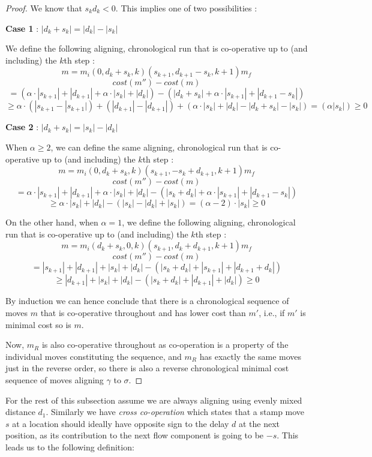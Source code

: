 \documentclass[runningheads]{llncs}
\begin{document}
\begin{proof}
        We know that $s_kd_k < 0$. 
        This implies one of two possibilities : 
        
        \textbf{Case 1} : $|d_k + s_k| = |d_k| - |s_k|$
        
        We define the following aligning, chronological run that is co-operative up to (and including) the $k$th step : 
        $$m = m_i( 0, d_k + s_k, k)( s_{k+1}, d_{k+1} - s_k, k+1)m_f$$
        $$cost(m'') - cost(m)  $$$$ = (\alpha \cdot |s_{k+1}| + |d_{k+1}| + \alpha \cdot |s_k| + |d_k|) - ( | d_k + s_k| + \alpha \cdot | s_{k+1}| + | d_{k+1} - s_k |) $$ 
        $$\geq \alpha \cdot (|s_{k+1} - |s_{k+1}|) + (|d_{k+1}| - |d_{k+1}|)+ (\alpha \cdot|s_k| + |d_k|  -| d_k + s_k|  - |s_k |) = (\alpha |s_k|)  \geq 0$$ 
        
        \textbf{Case 2} : $|d_k + s_k| = |s_k| - |d_k|$
        
        When $\alpha \geq 2$, we can define the same aligning, chronological run that is co-operative up to (and including) the $k$th step : 
        $$m = m_i( 0,d_k + s_k,  k)( s_{k+1}, -s_k + d_{k+1}, k+1)m_f$$
        $$cost(m'') - cost(m) $$$$= \alpha \cdot |s_{k+1}| + |d_{k+1}| + \alpha \cdot |s_k| + |d_k| - (|s_k + d_k | + \alpha \cdot| s_{k+1}| + | d_{k+1} - s_k |) $$
        $$\geq \alpha \cdot |s_k| + |d_k| - (|s_k| - |d_k| + |s_k|) = (\alpha - 2)\cdot |s_k| \geq 0$$
        
        On the other hand, when $\alpha = 1$, we define the following aligning, chronological run that is co-operative up to (and including) the $k$th step : 
        $$m = m_i( d_k + s_k, 0, k)( s_{k+1}, d_k + d_{k+1}, k+1)m_f$$
        $$cost(m'') - cost(m) $$$$= |s_{k+1}| + |d_{k+1}| + |s_k| + |d_k| - (|s_k + d_k | + | s_{k+1}| + | d_{k+1} + d_k |) $$
        $$\geq |d_{k+1}| + |s_k| + |d_k| - (|s_k + d_k | + | d_{k+1}| + |d_k |) \geq 0$$
        
        By induction we can hence conclude that there is a chronological sequence of moves $m$ that is co-operative throughout and has lower cost than $m'$, i.e., if $m'$ is minimal cost so is $m$.  
        
        Now, $m_R$ is also co-operative throughout as co-operation is a property of the individual moves constituting the sequence, and $m_R$ has exactly the same moves just in the reverse order, so there is also a reverse chronological minimal cost sequence of moves aligning $\gamma$ to $\sigma$. 
        
        \end{proof}
    For the rest of this subsection assume we are always aligning using evenly mixed distance $d_1$. 
    Similarly we have \emph{cross co-operation} which states that a stamp move $s$ at a location should ideally have opposite sign to the delay $d$ at the next position, as its contribution to the next flow component is going to be $-s$. 
    This leads us to the following definition: 
    
\end{document}
